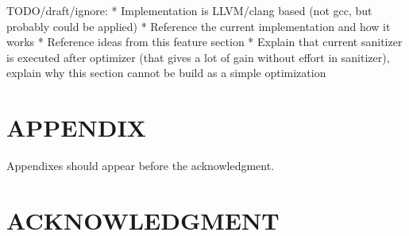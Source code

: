 \documentclass[letterpaper, 10 pt, conference]{IEEEtran}  %
\let\cite\parencite
\begin{document}
TODO/draft/ignore:
* Implementation is LLVM/clang based (not gcc, but probably could be applied)
* Reference the current implementation \cite{serebryany2012addresssanitizer} and how it works
* Reference \cite{serebryany2012addresssanitizer} ideas from this feature section
* Explain that current sanitizer is executed after optimizer (that gives a lot of gain without effort in sanitizer), explain why this section cannot be build as a simple optimization




\addtolength{\textheight}{-12cm}   %







\section*{APPENDIX}

Appendixes should appear before the acknowledgment.

\section*{ACKNOWLEDGMENT}




\printbibliography
\end{document}
